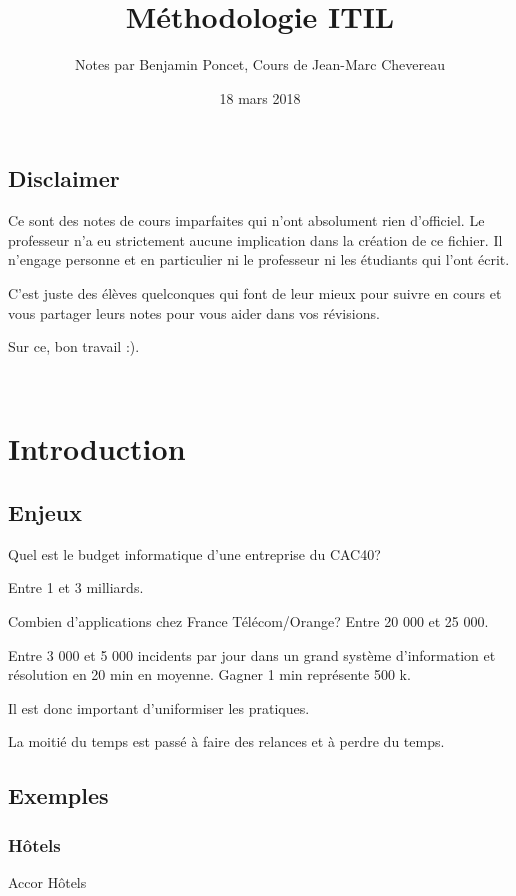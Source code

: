 \documentclass[a4paper,11pt]{article}
\title{Méthodologie ITIL}
\author{Notes par Benjamin Poncet, Cours de Jean-Marc Chevereau}
\date{18 mars 2018}
\newcommand{\euro}{\texteuro}
\begin{document}
\maketitle
\subsection*{Disclaimer}

Ce sont des notes de cours imparfaites qui n'ont absolument rien d'officiel.
Le professeur n'a eu strictement aucune implication dans la création de ce
fichier. Il n'engage personne et en particulier ni le professeur ni les
étudiants qui l'ont écrit.

C'est juste des élèves quelconques qui font de leur mieux pour suivre en cours
et vous partager leurs notes pour vous aider dans vos révisions.

Sur ce, bon travail :).
\tableofcontents

\

\section{Introduction}

\subsection{Enjeux}

Quel est le budget informatique d'une entreprise du CAC40?

Entre 1 et 3 milliards.

Combien d'applications chez France Télécom/Orange? Entre 20 000 et 25 000.

Entre 3 000 et 5 000 incidents par jour dans un grand système d'information et
résolution en 20 min en moyenne. Gagner 1 min représente 500 k\euro .

Il est donc important d'uniformiser les pratiques.

La moitié du temps est passé à faire des relances et à perdre du temps.

\subsection{Exemples}

\subsubsection{Hôtels}

Accor Hôtels
\end{document}
